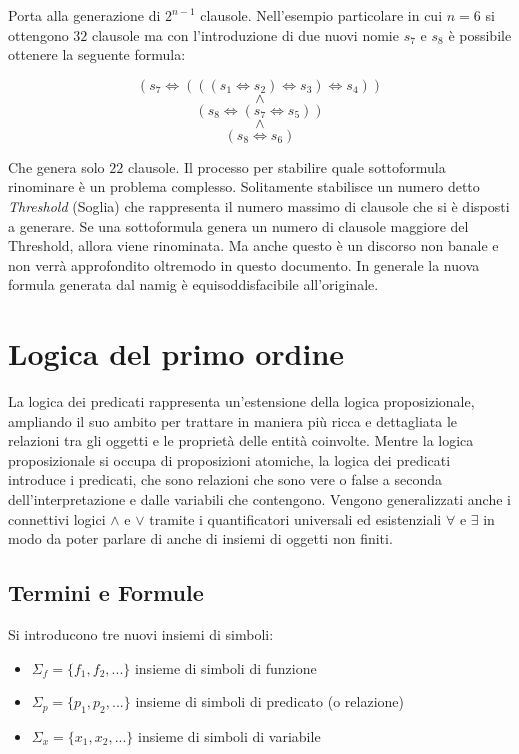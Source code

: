 \documentclass[./main.tex]{subfiles}
\begin{document}
Porta alla generazione di $2^{n-1}$ clausole. Nell'esempio particolare in cui $n=6$ si ottengono $32$ clausole ma con l'introduzione 
di due nuovi nomie $s_7$ e $s_8$ è possibile ottenere la seguente formula:

$$ (s_7 \Leftrightarrow (((s_1 \Leftrightarrow s_2) \Leftrightarrow s_3) \Leftrightarrow s_4)) $$
$$ \land $$
$$ (s_8 \Leftrightarrow (s_7 \Leftrightarrow s_5)) $$
$$ \land $$
$$ (s_8 \Leftrightarrow s_6) $$

Che genera solo $22$ clausole.
Il processo per stabilire quale sottoformula rinominare è un problema complesso. 
Solitamente stabilisce un numero detto \textit{Threshold} (Soglia) che rappresenta il numero massimo di clausole che si è disposti a generare.
Se una sottoformula genera un numero di clausole maggiore del Threshold, allora viene rinominata. 
Ma anche questo è un discorso non banale e non verrà approfondito oltremodo in questo documento.
In generale la nuova formula generata dal namig è equisoddisfacibile all'originale.


\section{Logica del primo ordine}

La logica dei predicati rappresenta un'estensione della logica proposizionale, 
ampliando il suo ambito per trattare in maniera più ricca e dettagliata le relazioni tra gli oggetti 
e le proprietà delle entità coinvolte. Mentre la logica proposizionale si occupa di proposizioni atomiche, 
la logica dei predicati introduce i predicati,
che sono relazioni che sono vere o false a seconda dell'interpretazione e dalle variabili che contengono.
Vengono generalizzati anche i connettivi logici $\land$ e $\lor$ tramite i quantificatori universali ed esistenziali $\forall$ e $\exists$
in modo da poter parlare di anche di insiemi di oggetti non finiti.


\subsection{Termini e Formule} \label{sec:sintassi_fof}
Si introducono tre nuovi insiemi di simboli:
\begin{itemize}
  \item $\Sigma_f = \{f_1, f_2, ...\}$ insieme di simboli di funzione
  \item $\Sigma_p = \{p_1, p_2, ...\}$ insieme di simboli di predicato (o relazione)
  \item $\Sigma_x = \{x_1, x_2, ...\}$ insieme di simboli di variabile
\end{itemize}
\end{document}
